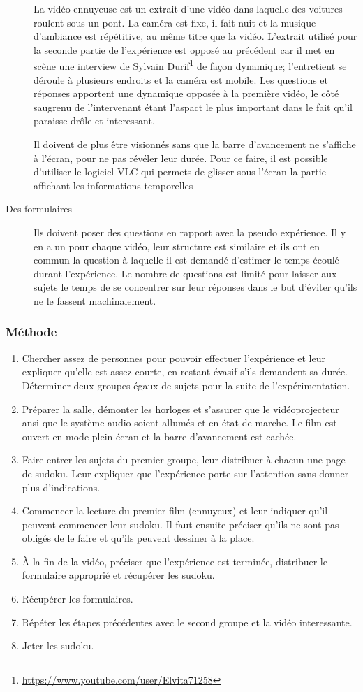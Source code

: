\documentclass[12pt,fleqn,oneside,french,openany]{book} %
\begin{document}
\begin{description}
	La vidéo ennuyeuse est un extrait d'une vidéo dans laquelle des voitures roulent sous un pont. La caméra est fixe, il fait nuit et la musique d'ambiance est répétitive, au même titre que la vidéo. L'extrait utilisé pour la seconde partie de l'expérience est opposé au précédent car il met en scène une interview de Sylvain Durif\footnote{\url{https://www.youtube.com/user/Elvita71258}} de façon dynamique; l'entretient se déroule à plusieurs endroits et la caméra est mobile. Les questions et réponses apportent une dynamique opposée à la première vidéo, le côté saugrenu de l'intervenant étant l'aspact le plus important dans le fait qu'il paraisse drôle et interessant. 

	Il doivent de plus être visionnés sans que la barre d'avancement ne s'affiche à l'écran, pour ne pas révéler leur durée. Pour ce faire, il est possible d'utiliser le logiciel VLC qui permets de glisser sous l'écran la partie affichant les informations temporelles
	\item[Des formulaires] Ils doivent poser des questions en rapport avec la pseudo expérience. Il y en a un pour chaque vidéo, leur structure est similaire et ils ont en commun la question à laquelle il est demandé d'estimer le temps écoulé durant l'expérience. Le nombre de questions est limité pour laisser aux sujets le temps de se concentrer sur leur réponses dans le but d'éviter qu'ils ne le fassent machinalement.
\end{description}

\subsubsection{Méthode} \label{sssec:methode1}
\begin{enumerate}
	\item Chercher assez de personnes pour pouvoir effectuer l'expérience et leur expliquer qu'elle est assez courte, en restant évasif s'ils demandent sa durée. Déterminer deux groupes égaux de sujets pour la suite de l'expérimentation.
	\item Préparer la salle, démonter les horloges et s'assurer que le vidéoprojecteur ansi que le système audio soient allumés et en état de marche. Le film est ouvert en mode plein écran et la barre d'avancement est cachée.
	\item Faire entrer les sujets du premier groupe, leur distribuer à chacun une page de sudoku. Leur expliquer que l'expérience porte sur l'attention sans donner plus d'indications. 
	\item Commencer la lecture du premier film (ennuyeux) et leur indiquer qu'il peuvent commencer leur sudoku. Il faut ensuite préciser qu'ils ne sont pas obligés de le faire et qu'ils peuvent dessiner à la place. 
	\item À la fin de la vidéo, préciser que l'expérience est terminée, distribuer le formulaire approprié et récupérer les sudoku.
	\item Récupérer les formulaires.
	\item Répéter les étapes précédentes avec le second groupe et la vidéo interessante.
	\item Jeter les sudoku.
\end{enumerate}
\end{document}
